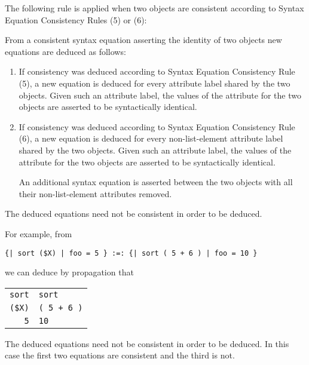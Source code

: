 \documentclass[12pt]{article}
\newcommand{\TT}[1]{{\tt \bfseries #1}}
\newcommand{\key}[1]{{\rm \bfseries #1}}
\newenvironment{indpar}[1][0.3in]%
	{\begin{list}{}%
		     {\setlength{\itemsep}{0in}%
		      \setlength{\topsep}{0in}%
		      \setlength{\parsep}{1ex}%
		      \setlength{\labelwidth}{#1}%
		      \setlength{\leftmargin}{#1}%
		      \addtolength{\leftmargin}{\labelsep}}%
	 \item}%
	{\end{list}}
\begin{document}
The following rule is applied when two objects are consistent according
to Syntax Equation Consistency Rules (5) or (6):

\begin{indpar}
\begin{list}{}{}
\item[\key{Syntax Equation Propagation Rules}%
           :]%
	   \label{SYNTAX-EQUATION-PROPAGATION-RULES}
From a consistent syntax equation asserting the identity
of two objects new equations are deduced as follows:
\begin{enumerate}
\item
If consistency was deduced according to Syntax Equation Consistency Rule (5),
a new equation is deduced for every attribute label shared by the two objects.
Given such an attribute label, the values
of the attribute for the two objects are asserted to be syntactically
identical.
\item
If consistency was deduced according to Syntax Equation Consistency Rule (6),
a new equation is deduced for every non-list-element
attribute label shared by the two objects.
Given such an attribute label, the values
of the attribute for the two objects are asserted to be syntactically
identical.

\medskip

An additional syntax equation is asserted between the two objects
with all their non-list-element attributes removed.
\end{enumerate}

The deduced equations need not be consistent in order to be deduced.
\end{list}
\end{indpar}

For example, from

\begin{center}
\verb/{| sort ($X) | foo = 5 } :=: {| sort ( 5 + 6 ) | foo = 10 }/
\end{center}

we can deduce by propagation that

\begin{center}
\begin{tabular}{r@\TT{~:=:~}l}
\verb/sort/ & \verb/sort/ \\
\verb/($X)/ & \verb/( 5 + 6 )/ \\
\verb/5/ & \verb/10/
\end{tabular}
\end{center}

The deduced equations need not be consistent in order to be deduced.
In this case the first two equations are consistent and the third is not.
\end{document}
